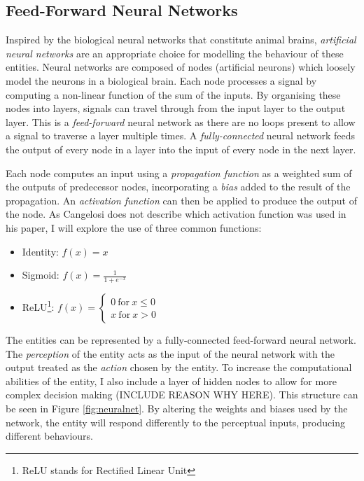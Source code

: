 \documentclass[12pt,a4paper,twoside,openright]{report}
\begin{document}
\subsection{Feed-Forward Neural Networks}\label{section:neural}

Inspired by the biological neural networks that constitute animal brains, \emph{artificial neural networks} are an appropriate choice for modelling the behaviour of these entities. Neural networks are composed of nodes (artificial neurons) which loosely model the neurons in a biological brain. Each node processes a signal by computing a non-linear function of the sum of the inputs. By organising these nodes into layers, signals can travel through from the input layer to the output layer. This is a \emph{feed-forward} neural network as there are no loops present to allow a signal to traverse a layer multiple times. A \emph{fully-connected} neural network feeds the output of every node in a layer into the input of every node in the next layer. 

Each node computes an input using a \emph{propagation function} as a weighted sum of the outputs of predecessor nodes, incorporating a \emph{bias} added to the result of the propagation. An \emph{activation function} can then be applied to produce the output of the node. As Cangelosi does not describe which activation function was used in his paper, I will explore the use of three common functions:

\begin{itemize}
	\item Identity: $f(x) = x$
	\item Sigmoid: $f(x) = \frac{1}{1+e^{-x}}$
	\item ReLU\footnote{ReLU stands for Rectified Linear Unit}:	$ f(x) = 
    \left\{
        \begin{array}{ll}
          0~\mathrm{for}~x \leq 0 \\
          x~\mathrm{for}~x > 0
        \end{array}
      \right.
      $
\end{itemize}

The entities can be represented by a fully-connected feed-forward neural network. The  \emph{perception} of the entity acts as the input of the neural network with the output treated as the \emph{action} chosen by the entity. To increase the computational abilities of the entity, I also include a layer of hidden nodes to allow for more complex decision making (INCLUDE REASON WHY HERE). This structure can be seen in Figure \ref{fig:neuralnet}. By altering the weights and biases used by the network, the entity will respond differently to the perceptual inputs, producing different behaviours. 
\end{document}
